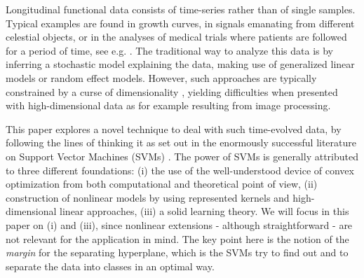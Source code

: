 \documentclass[12pt,a4paper]{article}%
\begin{document}
Longitudinal functional data consists of time-series rather than of single samples.
Typical examples are found in growth curves, in signals emanating from different celestial objects,
or in the analyses of medical trials where patients are followed for a period of time, see e.g. \cite{diggle1990time,diggle2002analysis}.
The traditional way to analyze this data is by inferring a stochastic model explaining the data,
making use of generalized linear models or random effect models.
However, such approaches are typically constrained by a curse of dimensionality \cite{hughes1968mean,oommen2008objective},
yielding difficulties when presented with high-dimensional data as for example resulting from image processing.




This paper explores a novel technique to deal with such time-evolved data,
by following the lines of thinking it as set out in the enormously successful literature on Support Vector Machines (SVMs)
\cite{cortes1995support,vapnik1998statistical,vapnik1999overview}.
The power of SVMs is generally attributed to three different foundations:
(i) the use of the well-understood device of convex optimization from both computational and theoretical point of view,
(ii) construction of nonlinear models by using represented kernels and high-dimensional linear approaches,
(iii) a solid learning theory.
We will focus in this paper on (i) and (iii), since nonlinear extensions - although straightforward - are not relevant for the application in mind.
The key point here is the notion of the {\em margin} for the separating hyperplane,
which is the SVMs try to find out and to separate the data into classes in an optimal way.
\end{document}
